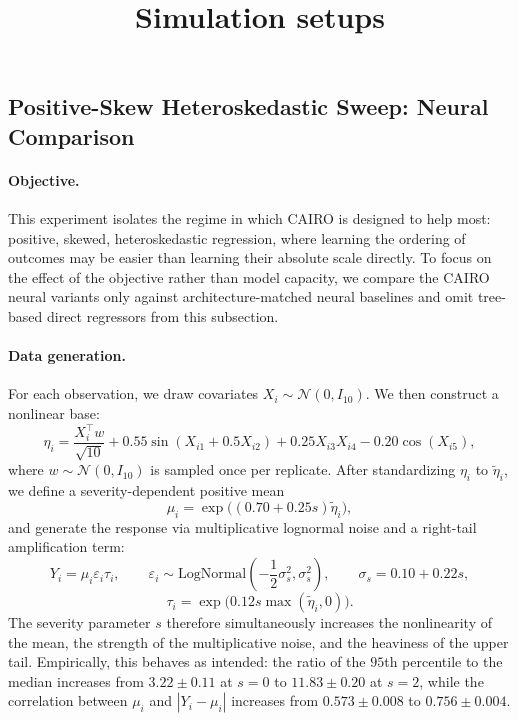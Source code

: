 \documentclass[11pt]{article}
\theoremstyle{plain}
\theoremstyle{plain}
\theoremstyle{plain}
\theoremstyle{plain}
\theoremstyle{plain}
\theoremstyle{plain}
\theoremstyle{plain}
\begin{document}
\title{Simulation setups}

\maketitle 

\providecommand{\PositiveSkewFigureDir}{../results/benchmarks/positive_skew_study/figures}

\subsection{Positive-Skew Heteroskedastic Sweep: Neural Comparison}
\label{sec:positive-skew-neural}

\paragraph{Objective.}
This experiment isolates the regime in which CAIRO is designed to help most: positive, skewed, heteroskedastic regression, where learning the ordering of outcomes may be easier than learning their absolute scale directly. To focus on the effect of the objective rather than model capacity, we compare the CAIRO neural variants only against architecture-matched neural baselines and omit tree-based direct regressors from this subsection.

\paragraph{Data generation.}
For each observation, we draw covariates $X_i \sim \mathcal{N}(0, I_{10}).$ We then construct a nonlinear base:
\[
\eta_i
=
\frac{X_i^\top w}{\sqrt{10}}
+ 0.55 \sin(X_{i1} + 0.5 X_{i2})
+ 0.25 X_{i3} X_{i4}
- 0.20 \cos(X_{i5}),
\]
where \(w \sim \mathcal{N}(0, I_{10})\) is sampled once per replicate. After standardizing \(\eta_i\) to \(\tilde{\eta}_i\), we define a severity-dependent positive mean
\[
\mu_i = \exp\!\big((0.70 + 0.25s)\tilde{\eta}_i\big),
\]
and generate the response via multiplicative lognormal noise and a right-tail amplification term:
\[
Y_i
=
\mu_i \varepsilon_i \tau_i,
\qquad
\varepsilon_i \sim \mathrm{LogNormal}\!\left(-\frac{1}{2}\sigma_s^2,\sigma_s^2\right),
\qquad
\sigma_s = 0.10 + 0.22s,
\]
\[
\tau_i = \exp\!\big(0.12s \max(\tilde{\eta}_i, 0)\big).
\]
The severity parameter \(s\) therefore simultaneously increases the nonlinearity of the mean, the strength of the multiplicative noise, and the heaviness of the upper tail. Empirically, this behaves as intended: the ratio of the \(95\)th percentile to the median increases from \(3.22 \pm 0.11\) at \(s=0\) to \(11.83 \pm 0.20\) at \(s=2\), while the correlation between \(\mu_i\) and \(|Y_i-\mu_i|\) increases from \(0.573 \pm 0.008\) to \(0.756 \pm 0.004\).
\end{document}
